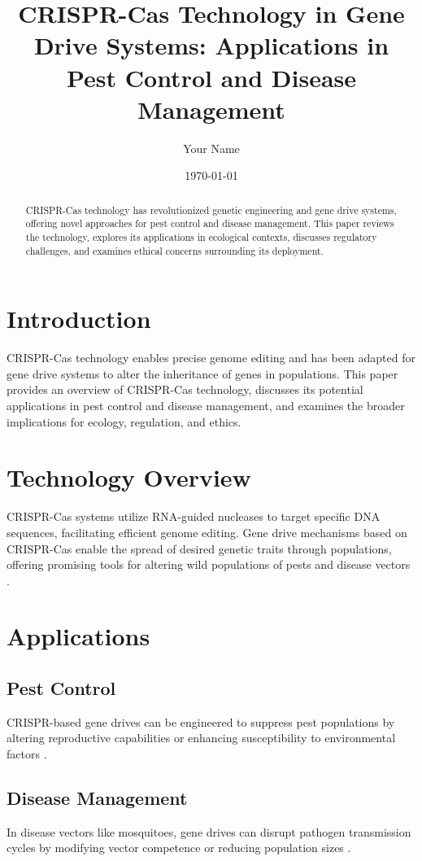 \documentclass[12pt]{article}
\title{CRISPR-Cas Technology in Gene Drive Systems: Applications in Pest Control and Disease Management}
\author{Your Name}
\date{\today}
\begin{document}
\maketitle

\begin{abstract}
CRISPR-Cas technology has revolutionized genetic engineering and gene drive systems, offering novel approaches for pest control and disease management. This paper reviews the technology, explores its applications in ecological contexts, discusses regulatory challenges, and examines ethical concerns surrounding its deployment.
\end{abstract}

\section{Introduction}
CRISPR-Cas technology enables precise genome editing and has been adapted for gene drive systems to alter the inheritance of genes in populations. This paper provides an overview of CRISPR-Cas technology, discusses its potential applications in pest control and disease management, and examines the broader implications for ecology, regulation, and ethics.

\section{Technology Overview}
CRISPR-Cas systems utilize RNA-guided nucleases to target specific DNA sequences, facilitating efficient genome editing. Gene drive mechanisms based on CRISPR-Cas enable the spread of desired genetic traits through populations, offering promising tools for altering wild populations of pests and disease vectors \citep{gantz2015modeling, esvelt2014concerning}.

\section{Applications}
\subsection{Pest Control}
CRISPR-based gene drives can be engineered to suppress pest populations by altering reproductive capabilities or enhancing susceptibility to environmental factors \citep{phillips2015regulation, champer2016emerging}.

\subsection{Disease Management}
In disease vectors like mosquitoes, gene drives can disrupt pathogen transmission cycles by modifying vector competence or reducing population sizes \citep{burt2003site, gantz2015modeling}.
\end{document}
